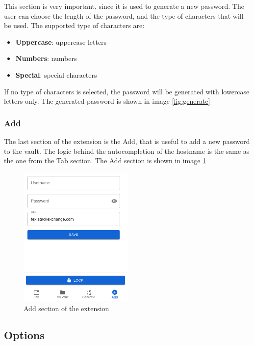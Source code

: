 This section is very important, since it is used to generate a new password. The user can choose the length of the password, and the type of characters that will be used. The supported type of characters are:

\begin{itemize}
    \item \textbf{Uppercase}: uppercase letters
    \item \textbf{Numbers}: numbers
    \item \textbf{Special}: special characters
\end{itemize}
If no type of characters is selected, the password will be generated with lowercase letters only.
The generated password is shown in image \ref{fig:generate}

\subsubsection{Add}

The last section of the extension is the Add, that is useful to add a new password to the vault. The logic behind the autocompletion of the hostname is the same as the one from the Tab section.
The Add section is shown in image \ref{fig:add}

\begin{figure}[h!]
    \centering
    \vspace{0.5cm}
    \includegraphics[width=0.5\textwidth]{images/add.png}
    \caption{Add section of the extension}
    \label{fig:add} %
\end{figure}


\subsection{Options}

